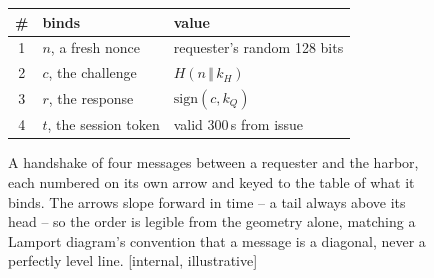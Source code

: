 \begin{figure}[H]
\centering
{}%
\footnotesize
\begin{tabular}{@{}c l l@{}}
\toprule
\# & binds & value \\
\midrule
1 & $n$, a fresh nonce & requester's random 128 bits \\
2 & $c$, the challenge & $H(n \,\Vert\, k_H)$ \\
3 & $r$, the response & $\mathrm{sign}(c, k_Q)$ \\
4 & $t$, the session token & valid 300\,s from issue \\
\bottomrule
\end{tabular}
\caption{A handshake of four messages between a requester and the harbor,
each numbered on its own arrow and keyed to the table of what it binds. The
arrows slope forward in time -- a tail always above its head -- so the
order is legible from the geometry alone, matching a Lamport diagram's
convention that a message is a diagonal, never a perfectly level line.
[internal, illustrative]}
\label{fig:tpl-message-ladder}
\end{figure}
